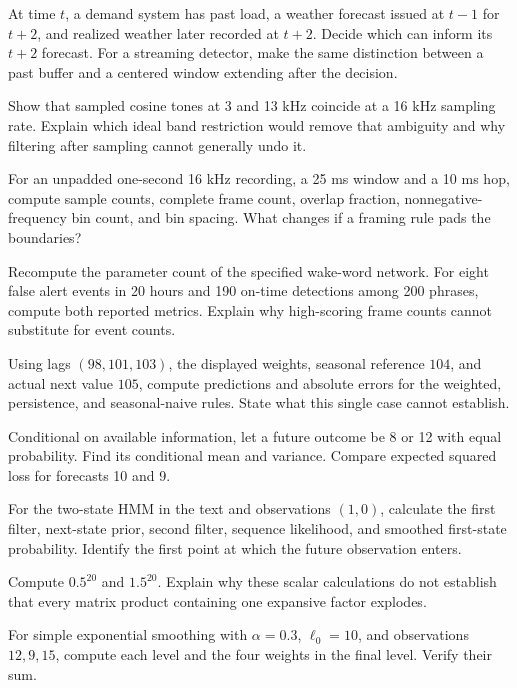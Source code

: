 \begin{exercises}
\item {}At time $t$, a demand system has past load, a weather forecast issued at $t-1$ for $t+2$, and realized weather later recorded at $t+2$. Decide which can inform its $t+2$ forecast. For a streaming detector, make the same distinction between a past buffer and a centered window extending after the decision.
\item {}Show that sampled cosine tones at 3 and 13 kHz coincide at a 16 kHz sampling rate. Explain which ideal band restriction would remove that ambiguity and why filtering after sampling cannot generally undo it.
\item {}For an unpadded one-second 16 kHz recording, a 25 ms window and a 10 ms hop, compute sample counts, complete frame count, overlap fraction, nonnegative-frequency bin count, and bin spacing. What changes if a framing rule pads the boundaries?
\item {}Recompute the parameter count of the specified wake-word network. For eight false alert events in 20 hours and 190 on-time detections among 200 phrases, compute both reported metrics. Explain why high-scoring frame counts cannot substitute for event counts.
\item {}Using lags $(98,101,103)$, the displayed weights, seasonal reference $104$, and actual next value $105$, compute predictions and absolute errors for the weighted, persistence, and seasonal-naive rules. State what this single case cannot establish.
\item {}Conditional on available information, let a future outcome be 8 or 12 with equal probability. Find its conditional mean and variance. Compare expected squared loss for forecasts 10 and 9.
\item {}For the two-state HMM in the text and observations $(1,0)$, calculate the first filter, next-state prior, second filter, sequence likelihood, and smoothed first-state probability. Identify the first point at which the future observation enters.
\item {}Compute $0.5^{20}$ and $1.5^{20}$. Explain why these scalar calculations do not establish that every matrix product containing one expansive factor explodes.
\item {}For simple exponential smoothing with $\alpha=0.3$, $\ell_0=10$, and observations $12,9,15$, compute each level and the four weights in the final level. Verify their sum.

\end{exercises}
